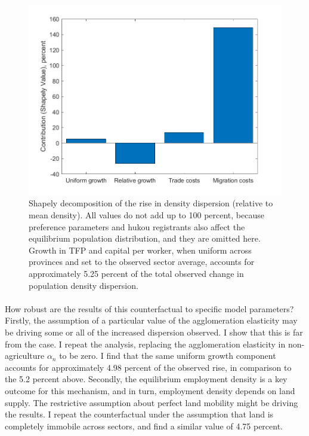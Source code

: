 \documentclass[]{article}
\theoremstyle{plain}
\begin{document}
	\begin{figure}[h]
		\includegraphics[width=\textwidth]{ShapelyDecomp.png}
		\caption{Shapely decomposition of the rise in density dispersion (relative to mean density). All values do not add up to 100 percent, because preference parameters and hukou registrants also affect the equilibrium population distribution, and they are omitted here. Growth in TFP and capital per worker, when uniform across provinces and set to the observed sector average, accounts for approximately 5.25 percent of the total observed change in population density dispersion.}
		\label{fig:Shapely}
	\end{figure}

\paragraph*{}
How robust are the results of this counterfactual to specific model parameters? Firstly, the assumption of a particular value of the agglomeration elasticity may be driving some or all of the increased dispersion observed. I show that this is far from the case. I repeat the analysis, replacing the agglomeration elasticity in non-agriculture $\alpha_{n}$ to be zero. I find that the same uniform growth component accounts for approximately 4.98 percent of the observed rise, in comparison to the 5.2 percent above. Secondly, the equilibrium employment density is a key outcome for this mechanism, and in turn, employment density depends on land supply. The restrictive assumption about perfect land mobility might be driving the results. I repeat the counterfactual under the assumption that land is completely immobile across sectors, and find a similar value of 4.75 percent.
\end{document}
